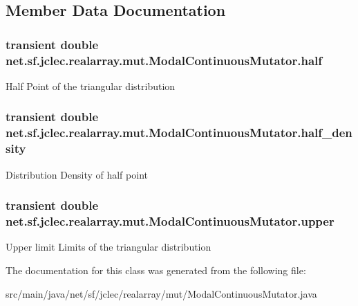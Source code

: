 \subsection{Member Data Documentation}
\hypertarget{classnet_1_1sf_1_1jclec_1_1realarray_1_1mut_1_1_modal_continuous_mutator_aec35075d9f0caf67dbbd7db4ae614361}{
\subsubsection[{half}]{\setlength{\rightskip}{0pt plus 5cm}transient double net.\-sf.\-jclec.\-realarray.\-mut.\-Modal\-Continuous\-Mutator.\-half\hspace{0.3cm}{\ttfamily [protected]}}}\label{classnet_1_1sf_1_1jclec_1_1realarray_1_1mut_1_1_modal_continuous_mutator_aec35075d9f0caf67dbbd7db4ae614361}
Half Point of the triangular distribution \hypertarget{classnet_1_1sf_1_1jclec_1_1realarray_1_1mut_1_1_modal_continuous_mutator_a68776187335c6495496dade940cb1949}{
\subsubsection[{half\-\_\-density}]{\setlength{\rightskip}{0pt plus 5cm}transient double net.\-sf.\-jclec.\-realarray.\-mut.\-Modal\-Continuous\-Mutator.\-half\-\_\-density\hspace{0.3cm}{\ttfamily [protected]}}}\label{classnet_1_1sf_1_1jclec_1_1realarray_1_1mut_1_1_modal_continuous_mutator_a68776187335c6495496dade940cb1949}
Distribution Density of half point \hypertarget{classnet_1_1sf_1_1jclec_1_1realarray_1_1mut_1_1_modal_continuous_mutator_a954aaccc85f1409fc80e44a85b77ac45}{
\subsubsection[{upper}]{\setlength{\rightskip}{0pt plus 5cm}transient double net.\-sf.\-jclec.\-realarray.\-mut.\-Modal\-Continuous\-Mutator.\-upper\hspace{0.3cm}{\ttfamily [protected]}}}\label{classnet_1_1sf_1_1jclec_1_1realarray_1_1mut_1_1_modal_continuous_mutator_a954aaccc85f1409fc80e44a85b77ac45}
Upper limit Limits of the triangular distribution 

The documentation for this class was generated from the following file\-:\begin{DoxyCompactItemize}
\item 
src/main/java/net/sf/jclec/realarray/mut/Modal\-Continuous\-Mutator.\-java\end{DoxyCompactItemize}
